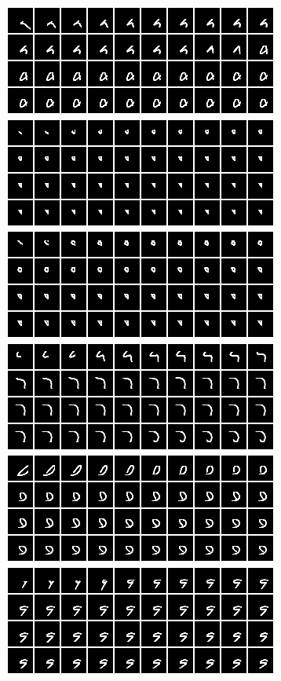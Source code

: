 \documentclass{article}
\begin{document}
\begin{figure}[htb!]
\centering
\includegraphics[scale=0.25]{../results/debug_recon/rand_init1.png}
\includegraphics[scale=0.25]{../results/debug_recon/rand_init3.png}
\includegraphics[scale=0.25]{../results/debug_recon/rand_init4.png}
\includegraphics[scale=0.25]{../results/debug_recon/rand_init5.png}
\includegraphics[scale=0.25]{../results/debug_recon/rand_init6.png}
\includegraphics[scale=0.25]{../results/debug_recon/rand_init7.png}

\end{figure}
\end{document}
